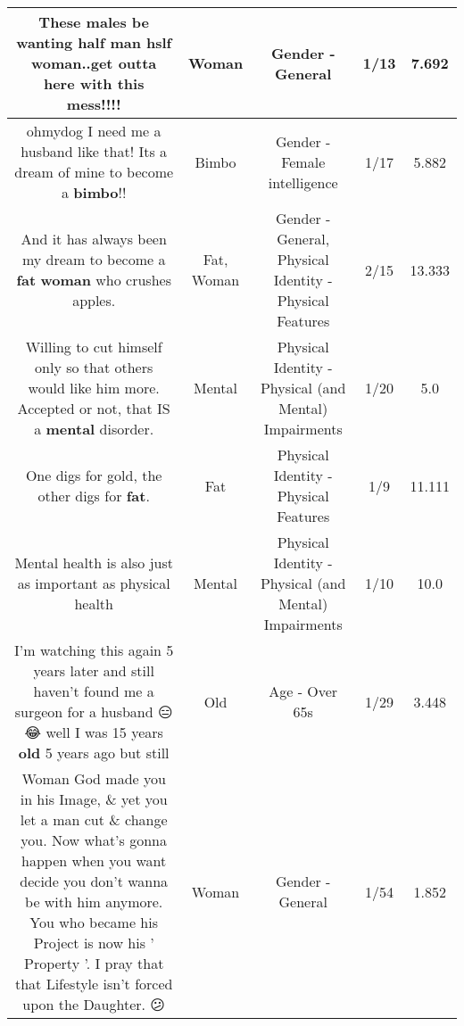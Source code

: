 \documentclass[11pt]{article}
\newlength\mylength
\begin{document}
\begin{center}
\begin{longtable}{|C{.65\mylength}|C{.30\mylength}|C{.12\mylength}|C{.12\mylength}|C{.12\mylength}|}
  \small These males be wanting half man hslf \textbf{woman}..get outta here with this mess!!!!\normalsize   & Woman & Gender - General & 1/13 & 7.692 \\  \hline
  \small ohmydog I need me a husband like that! Its a dream of mine to become a \textbf{bimbo}!!\normalsize   & Bimbo & Gender - Female intelligence & 1/17 & 5.882 \\  \hline
  \small And it has always been my dream to become a \textbf{fat} \textbf{woman} who crushes apples.\normalsize   & Fat, Woman & Gender - General, Physical Identity - Physical Features & 2/15 & 13.333 \\  \hline
  \small Willing to cut himself only so that others would like him more. Accepted or not, that IS a \textbf{mental} disorder.\normalsize   & Mental & Physical Identity - Physical (and Mental) Impairments & 1/20 & 5.0 \\  \hline
  \small One digs for gold, the other digs for \textbf{fat}.\normalsize   & Fat & Physical Identity - Physical Features & 1/9 & 11.111 \\  \hline
  \small Mental health is also just as important as physical health\normalsize   & Mental & Physical Identity - Physical (and Mental) Impairments & 1/10 & 10.0 \\  \hline
  \small I'm watching this again 5 years later and still haven't found me a surgeon for a husband 😑😂 well I was 15 years \textbf{old}  5 years ago but still\normalsize   & Old & Age - Over 65s & 1/29 & 3.448 \\  \hline
  \small Woman God made you in his Image, \& yet you let a man cut \& change you. Now what's gonna happen when you want decide you don't wanna be with him anymore. You who became his Project is now his ' Property '. I pray that that Lifestyle isn't forced upon the Daughter. 😕\normalsize   & Woman & Gender - General & 1/54 & 1.852 \\  \hline

\end{longtable}
\end{center}
\end{document}

